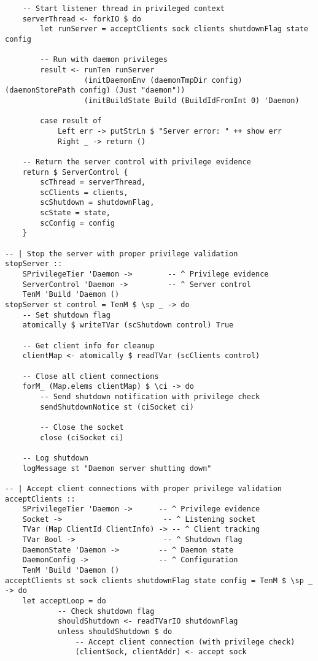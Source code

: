 \documentclass{article}
\begin{document}
\begin{tcolorbox}[title=Ten/Daemon/Server.hs Changes]
\begin{verbatim}
    -- Start listener thread in privileged context
    serverThread <- forkIO $ do
        let runServer = acceptClients sock clients shutdownFlag state config

        -- Run with daemon privileges
        result <- runTen runServer
                  (initDaemonEnv (daemonTmpDir config) (daemonStorePath config) (Just "daemon"))
                  (initBuildState Build (BuildIdFromInt 0) 'Daemon)

        case result of
            Left err -> putStrLn $ "Server error: " ++ show err
            Right _ -> return ()

    -- Return the server control with privilege evidence
    return $ ServerControl {
        scThread = serverThread,
        scClients = clients,
        scShutdown = shutdownFlag,
        scState = state,
        scConfig = config
    }

-- | Stop the server with proper privilege validation
stopServer ::
    SPrivilegeTier 'Daemon ->        -- ^ Privilege evidence
    ServerControl 'Daemon ->         -- ^ Server control
    TenM 'Build 'Daemon ()
stopServer st control = TenM $ \sp _ -> do
    -- Set shutdown flag
    atomically $ writeTVar (scShutdown control) True

    -- Get client info for cleanup
    clientMap <- atomically $ readTVar (scClients control)

    -- Close all client connections
    forM_ (Map.elems clientMap) $ \ci -> do
        -- Send shutdown notification with privilege check
        sendShutdownNotice st (ciSocket ci)

        -- Close the socket
        close (ciSocket ci)

    -- Log shutdown
    logMessage st "Daemon server shutting down"

-- | Accept client connections with proper privilege validation
acceptClients ::
    SPrivilegeTier 'Daemon ->      -- ^ Privilege evidence
    Socket ->                       -- ^ Listening socket
    TVar (Map ClientId ClientInfo) -> -- ^ Client tracking
    TVar Bool ->                    -- ^ Shutdown flag
    DaemonState 'Daemon ->         -- ^ Daemon state
    DaemonConfig ->                -- ^ Configuration
    TenM 'Build 'Daemon ()
acceptClients st sock clients shutdownFlag state config = TenM $ \sp _ -> do
    let acceptLoop = do
            -- Check shutdown flag
            shouldShutdown <- readTVarIO shutdownFlag
            unless shouldShutdown $ do
                -- Accept client connection (with privilege check)
                (clientSock, clientAddr) <- accept sock


\end{verbatim}
\end{tcolorbox}
\end{document}

